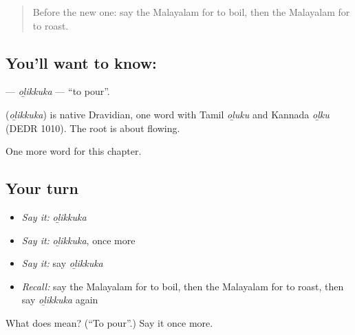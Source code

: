 \label{lesson:ML-C182-olikkuka}



\begin{quote}
Before the new one: say the Malayalam for to boil, then the Malayalam for to roast.
\end{quote}

\subsection*{You'll want to know: }
\textbf{} — \emph{oḻikkuka} — \textquotedblleft{}to pour\textquotedblright{}.

\begin{cousinweb}
\textbf{} (\emph{oḻikkuka}) is native Dravidian, one word with Tamil \emph{oḻuku} and Kannada \emph{oḻku} (DEDR 1010). The root is about flowing.
\end{cousinweb}

\begin{grammarlens}[title={What you've built}]
One more word for this chapter.
\end{grammarlens}

\subsection*{Your turn}
\begin{itemize}
\raggedright
  \item \emph{Say it:} \emph{oḻikkuka}
  \item \emph{Say it:} \emph{oḻikkuka}, once more
  \item \emph{Say it:} say \emph{oḻikkuka}
  \item \emph{Recall:} say the Malayalam for to boil, then the Malayalam for to roast, then say \emph{oḻikkuka} again
\end{itemize}

\begin{tcolorbox}[breakable,colback=teal!4,colframe=teal!35!black,title={Before you move on}]
What does  mean? (\textquotedblleft{}To pour\textquotedblright{}.) Say it once more.
\end{tcolorbox}
